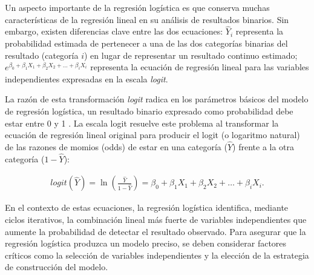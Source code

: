 \documentclass[12pt]{article}
\begin{document}
Un aspecto importante de la regresi\'on log\'istica es que conserva muchas caracter\'isticas de la regresi\'on lineal en su an\'alisis de resultados binarios. Sin embargo, existen diferencias clave entre las dos ecuaciones: $\hat{Y}_i$ representa la probabilidad estimada de pertenecer a una de las dos categor\'ias binarias del resultado (categor\'ia $i$) en lugar de representar un resultado continuo estimado; $e^{\beta_0 + \beta_1 X_1 + \beta_2 X_2 + \ldots + \beta_i X_i}$ representa la ecuaci\'on de regresi\'on lineal para las variables independientes expresadas en la escala \textit{logit}.\medskip

La raz\'on de esta transformaci\'on \textit{logit} radica en los par\'ametros b\'asicos del modelo de regresi\'on log\'istica, un resultado binario expresado como probabilidad debe estar entre 0 y 1 \cite{darlington1990}. La escala logit resuelve este problema al transformar la ecuaci\'on de regresi\'on lineal original para producir el logit (o logaritmo natural) de las razones de momios (odds) de estar en una categor\'ia ($\hat{Y}$) frente a la otra categor\'ia ($1 - \hat{Y}$):

\begin{eqnarray}
logit(\hat{Y})=\ln\left(\frac{\hat{Y}}{1 - \hat{Y}}\right) = \beta_0 + \beta_1 X_1 + \beta_2 X_2 + \ldots + \beta_i X_i.
\end{eqnarray}

En el contexto de estas ecuaciones, la regresi\'on log\'istica identifica, mediante ciclos iterativos, la combinaci\'on lineal m\'as fuerte de variables independientes que aumente la probabilidad de detectar el resultado observado. Para asegurar que la regresi\'on log\'istica produzca un modelo preciso, se deben considerar factores cr\'iticos como la selecci\'on de variables independientes y la elecci\'on de la estrategia de construcci\'on del modelo.

\end{document}
